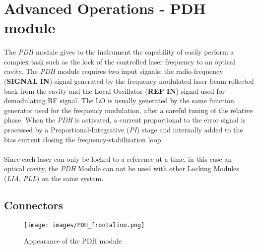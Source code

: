 \section{Advanced Operations - PDH module}   \label{PDH_main_chapter}
\paragraph{}The \textit{PDH} module gives to the \QubeModel  instrument the capability of easily perform a complex task such as 
the lock of the controlled laser frequency to an optical cavity.
\newline The \textit{PDH} module requires two input signals: the radio-frequency (\textbf{SIGNAL IN}) signal generated by the frequency-modulated laser beam reflected back from the cavity and the Local Oscillator (\textbf{REF IN}) signal used for demodulating RF signal. The LO is usually generated by the same function generator used for the frequency modulation, after a careful tuning of the relative phase.
\newline When the \textit{PDH} is activated, a current proportional to the error signal is processed by a Proportional-Integrative (\textit{PI}) stage and internally added to the bias current closing the frequency-stabilization loop.

\paragraph{} Since each laser can only be locked to a reference at a time, in this case an optical cavity, the \textit{PDH} Module can not be used with other Locking Modules (\textit{LIA}, \textit{PLL}) on the same \QubeModel  system.





\subsection{Connectors} \label{PDH_connector_chapter}
\begin{figure}[h]
    \centering
    \texttt{[image: images/PDH\_frontalino.png]}
    \caption{Appearance of the PDH module}
    \label{PDH_frontalino}
\end{figure}

